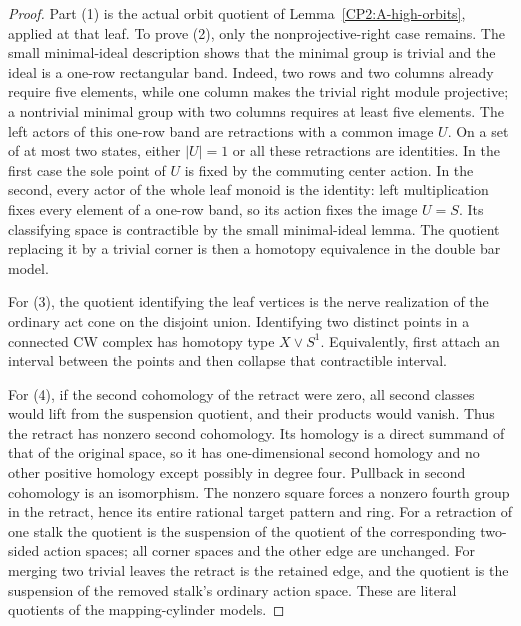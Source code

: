\begin{proof}
Part (1) is the actual orbit quotient of
Lemma~\ref{CP2:A-high-orbits}, applied at that leaf. To prove
(2), only the nonprojective-right case remains. The small
minimal-ideal description shows that the minimal group is
trivial and the ideal is a one-row rectangular band. Indeed,
two rows and two columns already require five elements,
while one column makes the trivial right module projective;
a nontrivial minimal group with two columns requires at
least five elements. The left actors of this one-row band
are retractions with a common image $U$. On a set of at
most two states, either $|U|=1$ or all these retractions
are identities. In the first case the sole point of $U$
is fixed by the commuting center action. In the second,
every actor of the whole leaf monoid is the identity:
left multiplication fixes every element of a one-row band,
so its action fixes the image $U=S$. Its classifying space
is contractible by the small minimal-ideal lemma. The
quotient replacing it by a trivial corner is then a
homotopy equivalence in the double bar model.

For (3), the quotient identifying the leaf vertices is
the nerve realization of the ordinary act cone on the
disjoint union. Identifying two distinct points in a
connected CW complex has homotopy type $X\vee S^1$.
Equivalently, first attach an interval between the points
and then collapse that contractible interval.

For (4), if the second cohomology of the retract were zero,
all second classes would lift from the suspension quotient,
and their products would vanish. Thus the retract has
nonzero second cohomology. Its homology is a direct summand
of that of the original space, so it has one-dimensional
second homology and no other positive homology except
possibly in degree four. Pullback in second cohomology is
an isomorphism. The nonzero square forces a nonzero fourth
group in the retract, hence its entire rational target
pattern and ring. For a retraction of one stalk the quotient
is the suspension of the quotient of the corresponding
two-sided action spaces; all corner spaces and the other
edge are unchanged. For merging two trivial leaves the
retract is the retained edge, and the quotient is the
suspension of the removed stalk's ordinary action space.
These are literal quotients of the mapping-cylinder models.
\end{proof}

